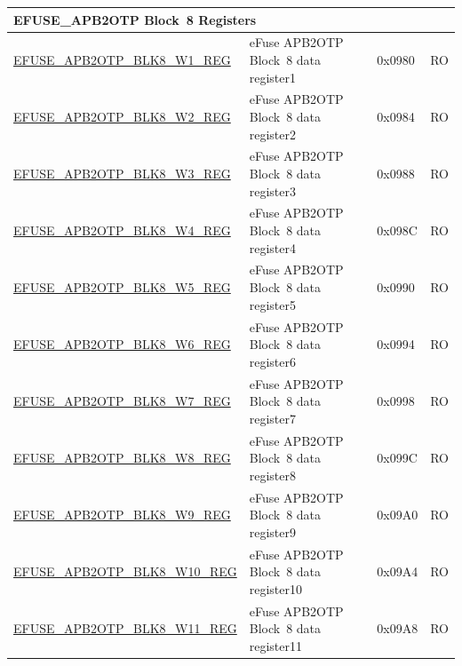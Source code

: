 \begin{longtable}{ | p{7cm} | p{6cm} | p{1.2cm} | p{1.5cm} | }
\multicolumn{4}{|l|}{\textbf{EFUSE\_APB2OTP Block~8 Registers}} \\ \hline
\hyperref[regdesc:EFUSEAPB2OTPBLK8WNREG]{EFUSE\_APB2OTP\_BLK8\_W1\_REG} & eFuse APB2OTP Block~8 data register1 & 0x0980 & RO \\\hline
\hyperref[regdesc:EFUSEAPB2OTPBLK8WNREG]{EFUSE\_APB2OTP\_BLK8\_W2\_REG} & eFuse APB2OTP Block~8 data register2 & 0x0984 & RO \\\hline
\hyperref[regdesc:EFUSEAPB2OTPBLK8WNREG]{EFUSE\_APB2OTP\_BLK8\_W3\_REG} & eFuse APB2OTP Block~8 data register3 & 0x0988 & RO \\\hline
\hyperref[regdesc:EFUSEAPB2OTPBLK8WNREG]{EFUSE\_APB2OTP\_BLK8\_W4\_REG} & eFuse APB2OTP Block~8 data register4 & 0x098C & RO \\\hline
\hyperref[regdesc:EFUSEAPB2OTPBLK8WNREG]{EFUSE\_APB2OTP\_BLK8\_W5\_REG} & eFuse APB2OTP Block~8 data register5 & 0x0990 & RO \\\hline
\hyperref[regdesc:EFUSEAPB2OTPBLK8WNREG]{EFUSE\_APB2OTP\_BLK8\_W6\_REG} & eFuse APB2OTP Block~8 data register6 & 0x0994 & RO \\\hline
\hyperref[regdesc:EFUSEAPB2OTPBLK8WNREG]{EFUSE\_APB2OTP\_BLK8\_W7\_REG} & eFuse APB2OTP Block~8 data register7 & 0x0998 & RO \\\hline
\hyperref[regdesc:EFUSEAPB2OTPBLK8WNREG]{EFUSE\_APB2OTP\_BLK8\_W8\_REG} & eFuse APB2OTP Block~8 data register8 & 0x099C & RO \\\hline
\hyperref[regdesc:EFUSEAPB2OTPBLK8WNREG]{EFUSE\_APB2OTP\_BLK8\_W9\_REG} & eFuse APB2OTP Block~8 data register9 & 0x09A0 & RO \\\hline
\hyperref[regdesc:EFUSEAPB2OTPBLK8WNREG]{EFUSE\_APB2OTP\_BLK8\_W10\_REG} & eFuse APB2OTP Block~8 data register10 & 0x09A4 & RO \\\hline
\hyperref[regdesc:EFUSEAPB2OTPBLK8WNREG]{EFUSE\_APB2OTP\_BLK8\_W11\_REG} & eFuse APB2OTP Block~8 data register11 & 0x09A8 & RO \\\hline



\end{longtable}
